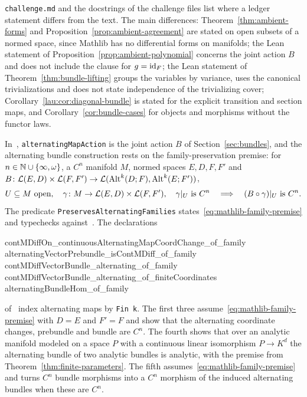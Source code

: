 \texttt{challenge.md} and the docstrings of the challenge files list where a ledger statement differs from the text.
The main differences: Theorem~\ref{thm:ambient-forms} and Proposition~\ref{prop:ambient-agreement} are stated on open
subsets of a normed space, since Mathlib has no differential forms on manifolds; the Lean statement of
Proposition~\ref{prop:ambient-polynomial} concerns the joint action $B$ and does not include the clause for $g=\mathrm{id}_F$; the Lean statement of
Theorem~\ref{thm:bundle-lifting} groups the variables by variance, uses the canonical trivializations and does not state
independence of the trivializing cover; Corollary~\ref{lau:cor:diagonal-bundle} is stated for the explicit transition
and section maps, and Corollary~\ref{cor:bundle-cases} for objects and morphisms without the functor laws.

In~\cite{LeanP}, \texttt{alternatingMapAction} is the joint action $B$ of Section~\ref{sec:bundles}, and
the alternating bundle construction rests on the family-preservation premise: for $n\in\mathbb N\cup\{\infty,\omega\}$, a
$C^n$ manifold $M$, normed spaces $E,D,F,F'$ and $B\colon\mathcal L(E,D)\times\mathcal L(F,F')\to\mathcal L(\operatorname{Alt}^k(D;F),\operatorname{Alt}^k(E;F'))$,
\begin{equation}\label{eq:mathlib-family-premise}
 U\subseteq M\text{ open},\quad \gamma\colon M\to\mathcal L(E,D)\times\mathcal L(F,F'),\quad \gamma|_U\text{ is }C^n
 \quad\Longrightarrow\quad (B\circ\gamma)|_U\text{ is }C^n.
\end{equation}
The predicate \texttt{PreservesAlternatingFamilies} states~\eqref{eq:mathlib-family-premise} and typechecks
against~\cite{LeanP}. The declarations
\begin{leancode}
contMDiffOn_continuousAlternatingMapCoordChange_of_family
alternatingVectorPrebundle_isContMDiff_of_family
contMDiffVectorBundle_alternating_of_family
contMDiffVectorBundle_alternating_of_finiteCoordinates
alternatingBundleHom_of_family
\end{leancode}
of~\cite{LeanP} index alternating maps by \texttt{Fin k}. The first three assume~\eqref{eq:mathlib-family-premise}
with $D=E$ and $F'=F$ and show that the alternating coordinate changes, prebundle and bundle are $C^n$. The fourth shows
that over an analytic manifold modeled on a space $P$ with a continuous linear isomorphism $P\to K^d$ the alternating
bundle of two analytic bundles is analytic, with the premise from Theorem~\ref{thm:finite-parameters}. The fifth
assumes~\eqref{eq:mathlib-family-premise} and turns $C^n$ bundle morphisms into a $C^n$ morphism of the induced
alternating bundles when these are $C^n$.
